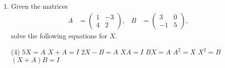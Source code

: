 \documentclass[a4paper,11pt]{article}
\begin{document}
\begin{enumerate}[label=1.\arabic*]
    \item Given the matrices
    \begin{align*}
        A &= \begin{pmatrix} 1 & -3 \\ 4 & 2 \end{pmatrix}, &
        B &= \begin{pmatrix} 3 & 0 \\ -1 & 5 \end{pmatrix},
    \end{align*}
    solve the following equations for $X$.
    \begin{tasks}(4)
        \task $5X = A$
        \task $X + A = I$
        \task $2X - B = A$
        \task $XA = I$
        \task $BX = A$
        \task $A^2 = X$
        \task $X^2 = B$
        \task $(X + A)B = I$
    \end{tasks}

\end{enumerate}
\end{document}
